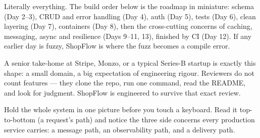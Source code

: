  Literally everything. The build order below is the roadmap in miniature: schema (Day 2--3), CRUD and error handling (Day 4), auth (Day 5), tests (Day 6), clean layering (Day 7), containers (Day 8), then the cross-cutting concerns of caching, messaging, async and resilience (Days 9--11, 13), finished by CI (Day 12). If any earlier day is fuzzy, ShopFlow is where the fuzz becomes a compile error.

 A senior take-home at Stripe, Monzo, or a typical Series-B startup is exactly this shape: a small domain, a big expectation of engineering rigour. Reviewers do not count features --- they clone the repo, run one command, read the README, and look for judgment. ShopFlow is engineered to survive that exact review.


Hold the whole system in one picture before you touch a keyboard. Read it top-to-bottom (a request's path) and notice the three side concerns every production service carries: a message path, an observability path, and a delivery path.

